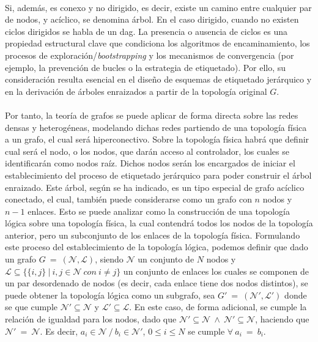 \\
Si, además, es conexo y no dirigido, es decir, existe un camino entre cualquier par de nodos, y acíclico, se denomina árbol. En el caso dirigido, cuando no existen ciclos dirigidos se habla de un \gls{dag}. La presencia o ausencia de ciclos es una propiedad estructural clave que condiciona los algoritmos de encaminamiento, los procesos de exploración/\textit{bootstrapping} y los mecanismos de convergencia (por ejemplo, la prevención de bucles o la estrategia de etiquetado). Por ello, su consideración resulta esencial en el diseño de esquemas de etiquetado jerárquico y en la derivación de árboles enraizados a partir de la topología original \(G\).\\
\\
Por tanto, la teoría de grafos se puede aplicar de forma directa sobre las redes densas y heterogéneas, modelando dichas redes partiendo de una topología física a un grafo, el cual será hiperconectivo. Sobre la topología física habrá que definir cual será el nodo, o los nodos, que darán acceso al controlador, los cuales se identificarán como nodos raíz. Dichos nodos serán los encargados de iniciar el establecimiento del proceso de etiquetado jerárquico para poder construir el árbol enraizado. Este árbol, según se ha indicado, es un tipo especial de grafo acíclico conectado, el cual, también puede considerarse como un grafo con $n$ nodos y $n-1$ enlaces. Esto se puede analizar como la construcción de una topología lógica sobre una topología física, la cual contendrá todos los nodos de la topología anterior, pero un subconjunto de los enlaces de la topología física. Formulando este proceso del establecimiento de la topología lógica, podemos definir que dado un grafo $G \: = \: (\mathcal{N}, \mathcal{L})$, siendo  $\mathcal{N}$ un conjunto de $N$ nodos y $\mathcal{L} \subseteq \{\{i,j\} \: | \: i,j \in \mathcal{N} \: con \: i \neq j\}$ un conjunto de enlaces los cuales se componen de un par desordenado de nodos (es decir, cada enlace tiene dos nodos distintos), se puede obtener la topología lógica como un subgrafo, sea $G' \: = \: (\mathcal{N}', \mathcal{L}')$ donde se que cumple $\mathcal{N}' \subseteq \mathcal{N}$ y $\mathcal{L}' \subseteq \mathcal{L}$. En este caso, de forma adicional, se cumple la relación de igualdad para los nodos, dado que $\mathcal{N}' \subseteq \mathcal{N} \: \wedge \: \mathcal{N}' \subseteq \mathcal{N} $, haciendo que $\mathcal{N}' \: = \: \mathcal{N}$. Es decir, $a_{i} \in \mathcal{N} \: / \: b_{i} \in \mathcal{N}'$, $0 \leq i \leq N$ se cumple $\forall \: a_{i} \: = \: b_{i}$.\\
